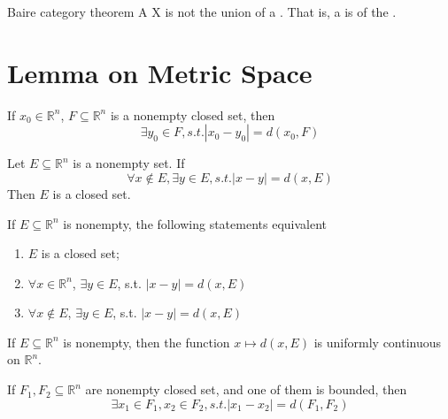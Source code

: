 \documentclass[../main.tex]{subfiles}
\begin{document}
\begin{theorem}{Baire category theorem}{}
A  X is not the union of a . That is, a  is of the .
\end{theorem}

\section{Lemma on Metric Space}

\begin{theorem}{}{}
    If \(  x_0 \in \mathbb{R} ^{n}  \), \(  F\subseteq \mathbb{R} ^{n}  \) is a nonempty closed set, then \[
    \exists y_0\in F, s.t. \left| x_0-y_0 \right|= d\left( x_0,F \right)  
    \]  
\end{theorem}

\begin{lemma}{}{}
    Let \(  E\subseteq \mathbb{R} ^{n}  \) is a nonempty set. If \[
    \forall x\not \in E, \exists y\in E, s.t. \left| x-y \right|= d\left( x,E \right)  
    \]Then \(  E  \) is a closed set.  
\end{lemma}

\begin{corollary}{}{}
    If \(  E\subseteq \mathbb{R} ^{n}  \) is nonempty, the following statements equivalent
    \begin{enumerate}
        \item \(  E  \) is a closed  set;
        \item \(  \forall x\in \mathbb{R} ^{n}  \), \(  \exists y \in E  \), s.t. \(  \left| x-y \right|= d\left( x,E \right)    \)    
        \item \(  \forall x\not \in E  \), \(  \exists y \in E  \), s.t. \(  \left| x-y \right|= d\left( x,E \right)    \)   
    \end{enumerate}
     
\end{corollary}

\begin{theorem}{}{}
    If \(  E\subseteq \mathbb{R} ^{n}  \) is nonempty, then the function \(  x\mapsto d\left( x,E \right)   \) is uniformly continuous on \(  \mathbb{R} ^{n}  \).   
\end{theorem}

\begin{corollary}{}{}
    If \(  F_1,F_2\subseteq \mathbb{R} ^{n}  \) are nonempty closed set, and one of them is bounded, then \[
    \exists x_1\in F_1, x_2\in F_2, s.t. \left| x_1-x_2 \right|= d\left( F_1,F_2 \right)  
    \] 
\end{corollary}
\end{document}
